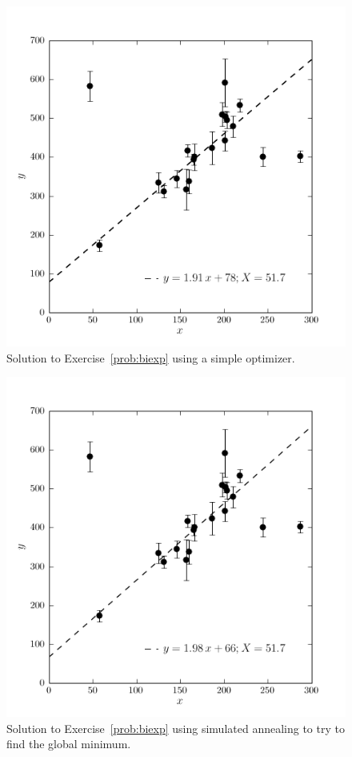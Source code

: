 \documentclass[12pt,twoside]{article}
\newcommand{\problemname}{Exercise}
\newcounter{problem}
\begin{document}
\clearpage
\begin{figure}[H]
\includegraphics[]{ex6a.png}
\caption{Solution to \problemname~\ref{prob:biexp} using a simple optimizer.}\label{fig:biexpa}
\end{figure}
\clearpage
\begin{figure}[H]
\includegraphics[]{ex6b.png}
\caption{Solution to \problemname~\ref{prob:biexp} using simulated annealing to try to find the global minimum.}\label{fig:biexpb}
\end{figure}
\end{document}
